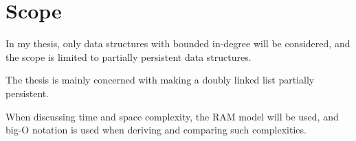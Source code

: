 \section{Scope}

In my thesis, only data structures with bounded in-degree will be considered,
and the scope is limited to partially persistent data structures.

The thesis is mainly concerned with making a doubly linked list partially
persistent.

When discussing time and space complexity, the RAM model will be used, and
big-O notation is used when deriving and comparing such complexities.
